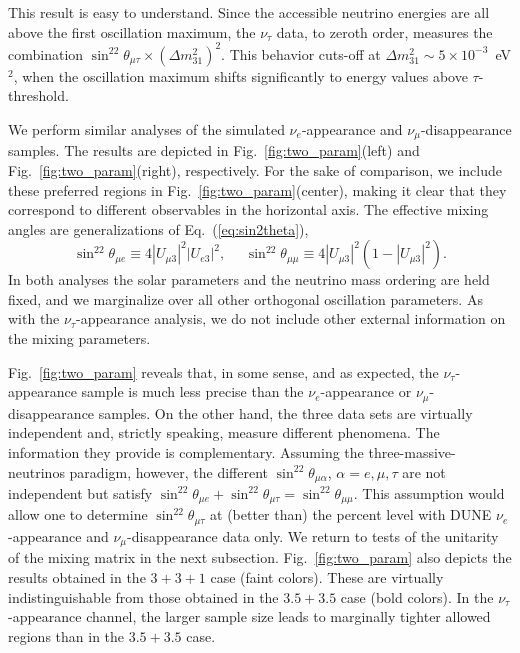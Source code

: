 \documentclass[aps,prd,onecolumn,nofootinbib,superscriptaddress, 11pt]{revtex4}
\begin{document}
This result is easy to understand. Since the accessible neutrino energies are all above the first oscillation maximum, the $\nu_{\tau}$ data, to zeroth order, measures the combination $\sin^22\theta_{\mu\tau}\times (\Delta m^2_{31})^2$. This behavior cuts-off at $\Delta m^2_{31}\sim 5\times 10^{-3}$~eV$^2$, when the oscillation maximum shifts significantly to energy values above $\tau$-threshold. 

We perform similar analyses of the simulated $\nu_e$-appearance and $\nu_{\mu}$-disappearance samples. The results are depicted in Fig.~\ref{fig:two_param}(left) and Fig.~\ref{fig:two_param}(right), respectively. For the sake of comparison, we include these preferred regions in Fig.~\ref{fig:two_param}(center), making it clear that they correspond to different observables in the horizontal axis. The effective mixing angles are generalizations of Eq.~(\ref{eq:sin2theta}),
\begin{equation}\label{eq:MixingAppDis}
\sin^22\theta_{\mu e}\equiv 4|U_{\mu3}|^2 |U_{e3}|^2,~~~~~~\sin^22\theta_{\mu\mu}\equiv 4|U_{\mu3}|^2(1-|U_{\mu3}|^2).
\end{equation}
In both analyses the solar parameters and the neutrino mass ordering are held fixed, and we marginalize over all other orthogonal oscillation parameters. As with the $\nu_{\tau}$-appearance analysis, we do not include other external information on the mixing parameters.

Fig.~\ref{fig:two_param} reveals that, in some sense, and as expected, the $\nu_{\tau}$-appearance sample is much less precise than the $\nu_{e}$-appearance or $\nu_{\mu}$-disappearance samples. On the other hand, the three data sets are virtually independent and, strictly speaking, measure different phenomena. The information they provide is complementary. Assuming the three-massive-neutrinos paradigm, however, the different $\sin^22\theta_{\mu\alpha}$, $\alpha=e,\mu,\tau$ are not independent but satisfy $\sin^22\theta_{\mu e}+\sin^22\theta_{\mu \tau}=\sin^22\theta_{\mu\mu}$. This assumption would allow one to determine $\sin^22\theta_{\mu \tau}$ at (better than) the percent level with DUNE $\nu_{e}$-appearance and $\nu_{\mu}$-disappearance data only. We return to tests of the unitarity of the mixing matrix in the next subsection. Fig.~\ref{fig:two_param} also depicts the results obtained in the $3+3+1$ case (faint colors). These are virtually indistinguishable from those obtained in the $3.5+3.5$ case (bold colors). In the $\nu_{\tau}$-appearance channel, the larger sample size leads to marginally tighter allowed regions than in the $3.5+3.5$ case.
\end{document}

